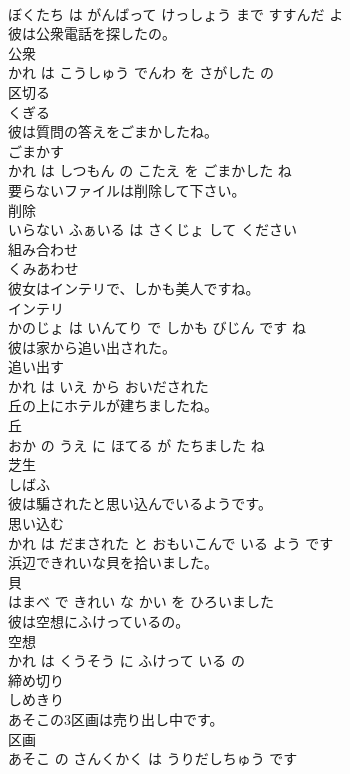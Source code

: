 \documentclass[8pt]{extreport}
\begin{document}
\begin{CJK}{UTF8}{min}
\\	ぼくたち は がんばって けっしょう まで すすんだ よ			
\\	彼は公衆電話を探したの。	
\\	公衆 
\\	かれ は こうしゅう でんわ を さがした の			
\\	区切る	
\\	くぎる			
\\	彼は質問の答えをごまかしたね。	
\\	ごまかす 
\\	かれ は しつもん の こたえ を ごまかした ね			
\\	要らないファイルは削除して下さい。	
\\	削除 
\\	いらない ふぁいる は さくじょ して ください			
\\	組み合わせ	
\\	くみあわせ			
\\	彼女はインテリで、しかも美人ですね。	
\\	インテリ 
\\	かのじょ は いんてり で しかも びじん です ね			
\\	彼は家から追い出された。	
\\	追い出す 
\\	かれ は いえ から おいだされた			
\\	丘の上にホテルが建ちましたね。	
\\	丘 
\\	おか の うえ に ほてる が たちました ね			
\\	芝生	
\\	しばふ			
\\	彼は騙されたと思い込んでいるようです。	
\\	思い込む 
\\	かれ は だまされた と おもいこんで いる よう です			
\\	浜辺できれいな貝を拾いました。	
\\	貝 
\\	はまべ で きれい な かい を ひろいました			
\\	彼は空想にふけっているの。	
\\	空想 
\\	かれ は くうそう に ふけって いる の			
\\	締め切り	
\\	しめきり			
\\	あそこの3区画は売り出し中です。	
\\	区画 
\\	あそこ の さんくかく は うりだしちゅう です			

\end{CJK}
\end{document}
